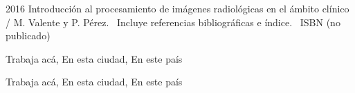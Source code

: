 \subtitle{Bases teóricas y analíticas}





\titlepage


\begin{copyrightpage}{2016}
Introducci\'on al procesamiento de im\'agenes radiol\'ogicas en el \'ambito cl\'inico / M. Valente y P. Pérez.
\    Incluye referencias bibliográficas e índice.
\    ISBN (no publicado)

\end{copyrightpage}



\dedication{...}

\begin{contributors}
 Trabaja acá, En esta ciudad, En este país

 Trabaja acá, En esta ciudad, En este país
\end{contributors}

\tableofcontents


